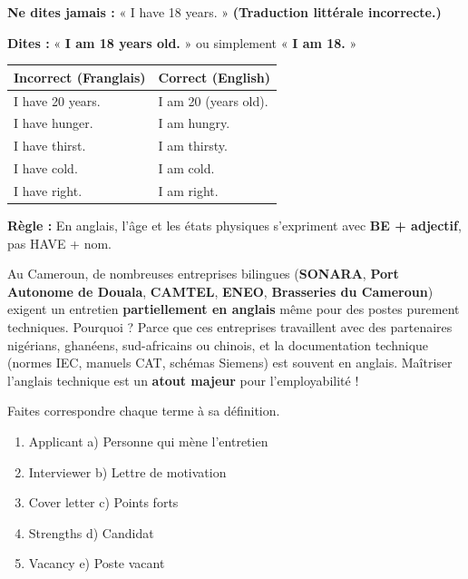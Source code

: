 \documentclass[11pt]{article}
\newcounter{popsec}
\newcounter{popsub}
\newcommand{\courssub}[1]{%
  \stepcounter{popsub}%
  \par\vspace{9pt}\noindent{\popxbold\fontsize{11.5}{13}\selectfont\color{popink}{\color{poporange}\thepopsec.\thepopsub}\hspace{6pt}#1}\par\nopagebreak\vspace{4pt}
}
\begin{document}
\begin{attention}
\textbf{Ne dites jamais :} « I have 18 years. » \textbf{(Traduction littérale incorrecte.)}

\textbf{Dites :} « \textbf{I am 18 years old.} » ou simplement « \textbf{I am 18.} »

\begin{center}
\begin{tabular}{|l|l|}\hline
\textbf{Incorrect (Franglais)} & \textbf{Correct (English)} \\ \hline
I have 20 years. & I am 20 (years old). \\ \hline
I have hunger. & I am hungry. \\ \hline
I have thirst. & I am thirsty. \\ \hline
I have cold. & I am cold. \\ \hline
I have right. & I am right. \\ \hline
\end{tabular}
\end{center}
\textbf{Règle :} En anglais, l'âge et les états physiques s'expriment avec \textbf{BE + adjectif}, pas HAVE + nom.
\end{attention}

\begin{savaistu}[Le savais-tu ?]
Au Cameroun, de nombreuses entreprises bilingues (\textbf{SONARA}, \textbf{Port Autonome de Douala}, \textbf{CAMTEL}, \textbf{ENEO}, \textbf{Brasseries du Cameroun}) exigent un entretien \textbf{partiellement en anglais} même pour des postes purement techniques. Pourquoi ? Parce que ces entreprises travaillent avec des partenaires nigérians, ghanéens, sud-africains ou chinois, et la documentation technique (normes IEC, manuels CAT, schémas Siemens) est souvent en anglais. Maîtriser l'anglais technique est un \textbf{atout majeur} pour l'employabilité !
\end{savaistu}

\courssub{Practice exercises}

\begin{exercice}
Faites correspondre chaque terme à sa définition.
\begin{enumerate}
    \item Applicant \hfill a) Personne qui mène l'entretien
    \item Interviewer \hfill b) Lettre de motivation
    \item Cover letter \hfill c) Points forts
    \item Strengths \hfill d) Candidat
    \item Vacancy \hfill e) Poste vacant
\end{enumerate}
\end{exercice}
\end{document}
